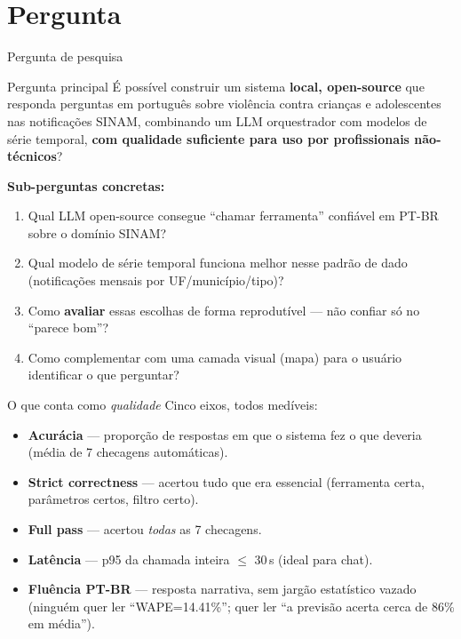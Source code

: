 \documentclass[10pt,aspectratio=169]{beamer}
\begin{document}
\section{Pergunta}

\begin{frame}{Pergunta de pesquisa}
\begin{block}{Pergunta principal}
É possível construir um sistema \textbf{local, open-source} que
responda perguntas em português sobre violência contra crianças e
adolescentes nas notificações SINAM, combinando um LLM orquestrador
com modelos de série temporal, \textbf{com qualidade suficiente para
uso por profissionais não-técnicos}?
\end{block}

\vspace{0.5em}
\textbf{Sub-perguntas concretas:}
\begin{enumerate}\small
\item Qual LLM open-source consegue ``chamar ferramenta'' confiável
em PT-BR sobre o domínio SINAM?
\item Qual modelo de série temporal funciona melhor nesse padrão de
dado (notificações mensais por UF/município/tipo)?
\item Como \textbf{avaliar} essas escolhas de forma reprodutível ---
não confiar só no ``parece bom''?
\item Como complementar com uma camada visual (mapa) para o usuário
identificar o que perguntar?
\end{enumerate}
\end{frame}

\begin{frame}{O que conta como \emph{qualidade}}
Cinco eixos, todos medíveis:
\begin{itemize}\setlength\itemsep{0.15em}\small
\item \textbf{Acurácia} --- proporção de respostas em que o sistema
fez o que deveria (média de 7 checagens automáticas).
\item \textbf{Strict correctness} --- acertou tudo que era essencial
(ferramenta certa, parâmetros certos, filtro certo).
\item \textbf{Full pass} --- acertou \emph{todas} as 7 checagens.
\item \textbf{Latência} --- p95 da chamada inteira $\le$ 30\,s
(ideal para chat).
\item \textbf{Fluência PT-BR} --- resposta narrativa, sem jargão
estatístico vazado (ninguém quer ler ``WAPE=14.41\%''; quer ler
``a previsão acerta cerca de 86\% em média'').
\end{itemize}
\end{frame}
\end{document}
